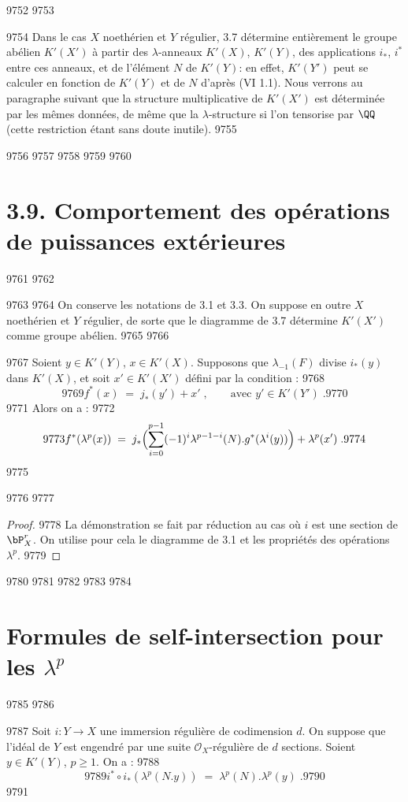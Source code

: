   9752	
  9753	\begin{remarque}[3.8]%
  9754	Dans le cas $X$ noethérien et $Y$ régulier, 3.7 détermine entièrement le groupe abélien $K'(X')$ à partir des $\lambda$-anneaux $K'(X)$, $K'(Y)$, des applications $i_*$, $i^*$ entre ces anneaux, et de l'élément $N$ de $K'(Y)$: en effet, $K'(Y')$ peut se calculer en fonction de $K'(Y)$ et de $N$ d'après (VI 1.1). Nous verrons au paragraphe suivant que la structure multiplicative de $K'(X')$ est déterminée par les mêmes données, de même que la $\lambda$-structure si l'on tensorise par $\QQ$ (cette restriction étant sans doute inutile).
  9755	\end{remarque}
  9756	
  9757	\setcounter{section}{3}
  9758	\setcounter{proposition}{8}
  9759	
  9760	\section*{3.9. Comportement des opérations de puissances extérieures}
  9761	
  9762	
  9763	
  9764	On conserve les notations de 3.1 et 3.3. On suppose en outre $X$ noethérien et $Y$ régulier, de sorte que le diagramme de 3.7 détermine $K'(X')$ comme groupe abélien.
  9765	
  9766	\begin{proposition}[3.9]%
  9767	Soient $y \in K'(Y)$, $x \in K'(X)$. Supposons que $\lambda_{-1}(F)$ divise $i_*(y)$ dans $K'(X)$, et soit $x' \in K'(X')$ défini par la condition :
  9768	\[
  9769	f^*(x) \; = \; j_*(y') + x'\; , \qquad \text{avec } y' \in K'(Y')\; .
  9770	\]
  9771	Alors on a :
  9772	\[
  9773	f^*(\lambda^p(x)) \; = \; j_*\Bigl(\sum_{i=0}^{p-1} (-1)^i \lambda^{p-1-i}(N).g^*(\lambda^i(y))\Bigr) + \lambda^p(x')\; .
  9774	\]
  9775	\end{proposition}
  9776	
  9777	\begin{proof}
  9778	La démonstration se fait par réduction au cas où $i$ est une section de $\bP^r_X$. On utilise pour cela le diagramme de 3.1 et les propriétés des opérations $\lambda^p$.
  9779	\end{proof}
  9780	
  9781	\setcounter{section}{4}
  9782	\setcounter{proposition}{1}
  9783	
  9784	\section{Formules de self-intersection pour les $\lambda^p$}
  9785	
  9786	\begin{proposition}[4.1]%
  9787	Soit $i : Y \to X$ une immersion régulière de codimension $d$. On suppose que l'idéal de $Y$ est engendré par une suite $\mathscr{O}_X$-régulière de $d$ sections. Soient $y \in K'(Y)$, $p \geq 1$. On a :
  9788	\[
  9789	i^* \circ i_*(\lambda^p(N.y)) \; = \; \lambda^p(N) . \lambda^p(y)\; .
  9790	\]
  9791	\end{proposition}
